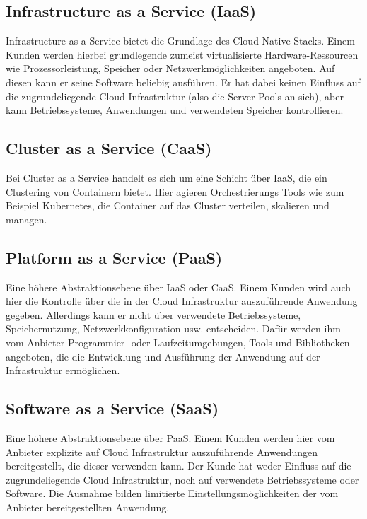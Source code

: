 \subsection{Infrastructure as a Service (IaaS)}
Infrastructure as a Service bietet die Grundlage des Cloud Native Stacks. Einem Kunden werden hierbei grundlegende zumeist virtualisierte Hardware-Ressourcen wie Prozessorleistung, Speicher oder Netzwerkmöglichkeiten angeboten. Auf diesen kann er seine Software beliebig ausführen. Er hat dabei keinen Einfluss auf die zugrundeliegende Cloud Infrastruktur (also die Server-Pools an sich), aber kann Betriebssysteme, Anwendungen und verwendeten Speicher kontrollieren\cite{mell_nist_2011}. \\

\subsection{Cluster as a Service (CaaS)}
Bei Cluster as a Service handelt es sich um eine Schicht über IaaS, die ein Clustering von Containern bietet. Hier agieren Orchestrierungs Tools wie zum Beispiel Kubernetes, die Container auf das Cluster verteilen, skalieren und managen\cite{kratzke_clouns_2016}. \\

\subsection{Platform as a Service (PaaS)}
Eine höhere Abstraktionsebene über IaaS oder CaaS. Einem Kunden wird auch hier die Kontrolle über die in der Cloud Infrastruktur auszuführende Anwendung gegeben. Allerdings kann er nicht über verwendete Betriebssysteme, Speichernutzung, Netzwerkkonfiguration usw. entscheiden. Dafür werden ihm vom Anbieter Programmier- oder Laufzeitumgebungen, Tools und Bibliotheken angeboten, die die Entwicklung und Ausführung der Anwendung auf der Infrastruktur ermöglichen\cite{mell_nist_2011}.\\

\subsection{Software as a Service (SaaS)}
Eine höhere Abstraktionsebene über PaaS. Einem Kunden werden hier vom Anbieter explizite auf Cloud Infrastruktur auszuführende Anwendungen bereitgestellt, die dieser verwenden kann. Der Kunde hat weder Einfluss auf die zugrundeliegende Cloud Infrastruktur, noch auf verwendete Betriebssysteme oder Software. Die Ausnahme bilden limitierte Einstellungsmöglichkeiten der vom Anbieter bereitgestellten Anwendung\cite{mell_nist_2011}.

